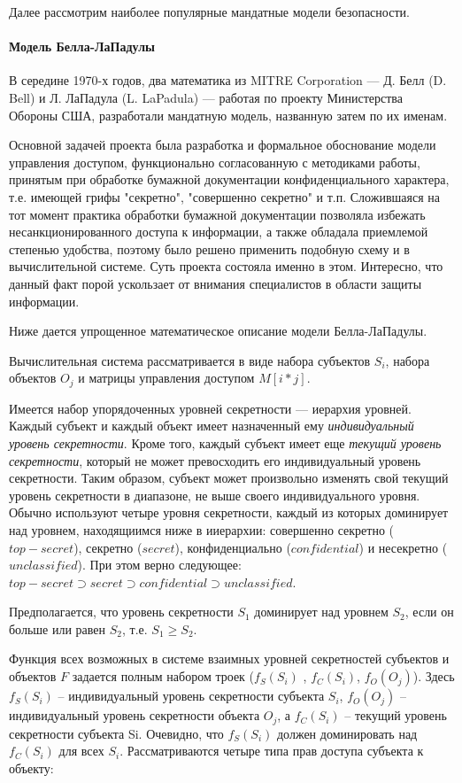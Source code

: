 Далее рассмотрим наиболее популярные мандатные модели безопасности.

\paragraph{Модель Белла-ЛаПадулы}

В середине 1970-х годов, два математика из MITRE Corporation --- Д. Белл (D. Bell) и Л. ЛаПадула (L. LaPadula) --- работая по проекту Министерства Обороны США, разработали мандатную модель, названную затем по их именам.

Основной задачей проекта была разработка и формальное обоснование модели управления доступом, функционально согласованную с методиками работы, принятым при обработке бумажной документации конфиденциального характера, т.е. имеющей грифы "секретно", "совершенно секретно" и т.п. Сложившаяся на тот момент практика обработки бумажной документации позволяла избежать несанкционированного доступа к информации, а также обладала приемлемой степенью удобства, поэтому было решено применить подобную схему и в вычислительной системе. Суть проекта состояла именно в этом. Интересно, что данный факт порой ускользает от внимания специалистов в области защиты информации.

Ниже дается упрощенное математическое описание модели Белла-ЛаПадулы.

Вычислительная система рассматривается в виде набора субъектов $S_{i}$, набора объектов $O_{j}$ и матрицы управления доступом $M[i*j]$.

Имеется набор упорядоченных уровней секретности --- иерархия уровней. Каждый субъект и каждый объект имеет назначенный ему \textit{индивидуальный уровень секретности}. Кроме того, каждый субъект имеет еще \textit{текущий уровень секретности}, который не может превосходить его индивидуальный уровень секретности. Таким образом, субъект может произвольно изменять свой текущий уровень секретности в диапазоне, не выше своего индивидуального уровня. Обычно используют четыре уровня секретности, каждый из которых доминирует над уровнем, находящиимся ниже в ииерархии: совершенно секретно ($top-secret$),  секретно ($secret$),  конфиденциально ($confidential$) и несекретно ($unclassified$).  При этом верно следующее: $ top-secret \supset secret \supset confidential \supset unclassified $.

Предполагается, что уровень секретности $S_1$ доминирует над уровнем $S_2$, если он больше или равен $S_2$, т.е. $S_1 \geq S_2$.

Функция всех возможных в системе взаимных уровней секретностей субъектов и объектов $F$ задается полным набором троек ($f_S(S_i)$ , $f_C(S_i)$, $f_O(O_j)$). Здесь $f_S(S_i)$ – индивидуальный уровень секретности субъекта $S_i$, $f_O(O_j)$ – индивидуальный уровень секретности объекта $O_j$, а $f_C(S_i)$ – текущий уровень секретности субъекта Si. Очевидно, что $f_S(S_i)$ должен доминировать над $f_C(S_i)$ для всех $S_i$. Рассматриваются четыре типа прав доступа субъекта к объекту:


